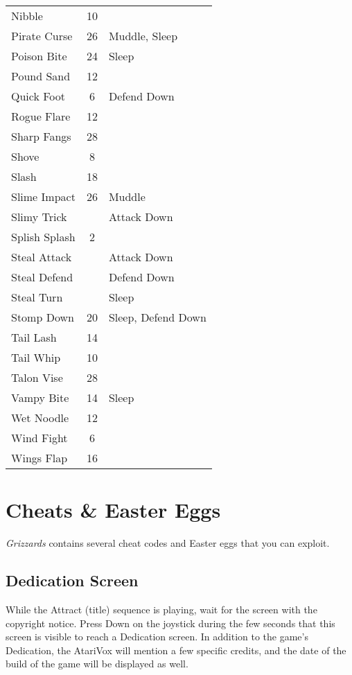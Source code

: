 \documentclass[10pt,twocolumn]{memoir}
\begin{document}
\begin{tabular}{l c l}
             Nibble & 10 & \\
             Pirate Curse & 26 & Muddle, Sleep \\
             Poison Bite & 24 & Sleep \\
             Pound Sand & 12 & \\
             Quick Foot & 6 & Defend Down \\
             Rogue Flare & 12 & \\
             Sharp Fangs & 28 & \\
             Shove & 8 & \\
             Slash & 18 & \\
             Slime Impact & 26 & Muddle \\
             Slimy Trick & & Attack Down \\
             Splish Splash & 2 & \\
             Steal Attack & & Attack Down \\
             Steal Defend & & Defend Down \\
             Steal Turn & & Sleep \\
             Stomp Down & 20 & Sleep, Defend Down\\
             Tail Lash & 14 & \\
             Tail Whip & 10 & \\
             Talon Vise & 28 & \\
             Vampy Bite & 14 & Sleep \\
             Wet Noodle & 12 & \\
             Wind Fight & 6 & \\
             Wings Flap & 16 & \\
\end{tabular}

\chapter{Cheats \& Easter Eggs}

\textit{Grizzards} contains several cheat codes and Easter eggs that you
can exploit.

\section{Dedication Screen}

While the Attract (title) sequence is  playing, wait for the screen with
the copyright notice. Press Down on  the joystick during the few seconds
that this screen is visible to reach a Dedication screen. In addition to
the game's Dedication, the AtariVox will mention a few specific credits,
and the date of the build of the game will be displayed as well.
\end{document}
